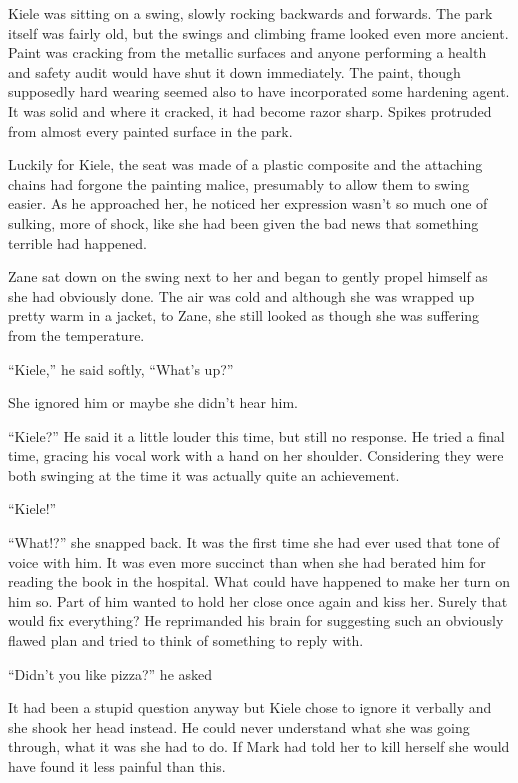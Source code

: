 \thoughtbreak



Kiele was sitting on a swing, slowly rocking backwards and forwards.  The park itself was fairly old, but the swings and climbing frame looked even more ancient.  Paint was cracking from the metallic surfaces and anyone performing a health and safety audit would have shut it down immediately.  The paint, though supposedly hard wearing seemed also to have incorporated some hardening agent.  It was solid and where it cracked, it had become razor sharp.  Spikes protruded from almost every painted surface in the park.

Luckily for Kiele, the seat was made of a plastic composite and the attaching chains had forgone the painting malice, presumably to allow them to swing easier.  As he approached her, he noticed her expression wasn't so much one of sulking, more of shock, like she had been given the bad news that something terrible had happened.

Zane sat down on the swing next to her and began to gently propel himself as she had obviously done.  The air was cold and although she was wrapped up pretty warm in a jacket, to Zane, she still looked as though she was suffering from the temperature.

``Kiele,'' he said softly, ``What's up?''

She ignored him or maybe she didn't hear him.

``Kiele?''  He said it a little louder this time, but still no response.  He tried a final time, gracing his vocal work with a hand on her shoulder.  Considering they were both swinging at the time it was actually quite an achievement.

``Kiele!''  

``What!?'' she snapped back.  It was the first time she had ever used that tone of voice with him.  It was even more succinct than when she had berated him for reading the book in the hospital.  What could have happened to make her turn on him so.  Part of him wanted to hold her close once again and kiss her.  Surely that would fix everything?  He reprimanded his brain for suggesting such an obviously flawed plan and tried to think of something to reply with.

``Didn't you like pizza?'' he asked

It had been a stupid question anyway but Kiele chose to ignore it verbally and she shook her head instead.  He could never understand what she was going through, what it was she had to do.  If Mark had told her to kill herself she would have found it less painful than this.

